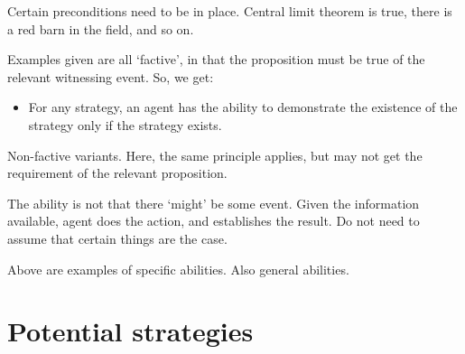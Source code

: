 \documentclass[10pt]{article}
\begin{document}
\begin{note}
  Certain preconditions need to be in place.
  Central limit theorem is true, there is a red barn in the field, and so on.

  Examples given are all `factive', in that the proposition must be true of the relevant witnessing event.
  So, we get:
  \begin{itemize}
  \item For any strategy, an agent has the ability to demonstrate the existence of the strategy only if the strategy exists.
  \end{itemize}

  Non-factive variants.
  Here, the same principle applies, but may not get the requirement of the relevant proposition.
\end{note}

\begin{note}
  The ability is not that there `might' be some event.
  Given the information available, agent does the action, and establishes the result.
  Do not need to assume that certain things are the case.
\end{note}

\begin{note}
  Above are examples of specific abilities.
  Also general abilities.
\end{note}

\section{Potential strategies}
\label{sec:potential-strategies}
\end{document}
